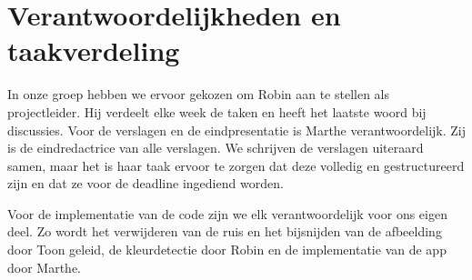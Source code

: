 \documentclass[a4paper]{article}
\begin{document}
	\section{Verantwoordelijkheden en taakverdeling}		
		In onze groep hebben we ervoor gekozen om Robin aan te stellen als projectleider. Hij verdeelt elke week de taken en heeft het laatste woord bij discussies. 
		Voor de verslagen en de eindpresentatie is Marthe verantwoordelijk. Zij is de eindredactrice van alle verslagen. We schrijven de verslagen uiteraard samen, maar het is haar taak ervoor te zorgen dat deze volledig en gestructureerd zijn en dat ze voor de deadline ingediend worden. 
		
		Voor de implementatie van de code zijn we elk verantwoordelijk voor ons eigen deel. Zo wordt het verwijderen van de ruis en het bijsnijden van de afbeelding door Toon geleid, de kleurdetectie door Robin en de implementatie van de app door Marthe.
\end{document}

